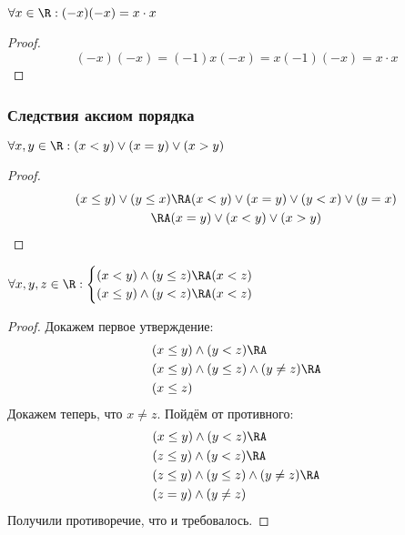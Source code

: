 \documentclass[a4paper, 14pt]{article}
\begin{document}
    \begin{theorem}
        $\forall x \in \R: (-x)(-x) = x \cdot x$
    \end{theorem}
    \begin{proof}
        \begin{equation*}
            (-x)(-x) = (-1)x(-x) = x(-1)(-x) = x \cdot x
        \end{equation*}
    \end{proof}

    \subsubsection*{Следствия аксиом порядка}

    \begin{theorem}
        $\forall x,y \in \R: (x < y) \lor (x = y) \lor (x > y)$
    \end{theorem}
    \begin{proof}
        \begin{multline*}
            (x \leq y) \lor (y \leq x) \RA (x < y) \lor (x = y) \lor (y < x) \lor (y = x) \\ \RA (x=y) \lor (x<y) \lor (x>y)
        \end{multline*}    
    \end{proof}

    \begin{theorem} $\forall x,y,z \in \R:
        \begin{cases}
            (x < y) \land (y \leq z) \RA (x < z) \\
            (x \leq y) \land (y < z) \RA (x < z)    
        \end{cases}$
    \end{theorem}
    \begin{proof}
        Докажем первое утверждение:
        \begin{align*}
            &(x \leq y) \land (y < z) \RA  \\
            &(x \leq y) \land (y \leq z) \land (y \neq z) \RA \\
            &(x \leq z)
        \end{align*}
        Докажем теперь, что $x \neq z$. Пойдём от противного:
        \begin{align*}
            &(x \leq y) \land (y < z) \RA \\
            &(z \leq y) \land (y < z) \RA \\
            &(z \leq y) \land (y \leq z) \land (y \neq z) \RA \\
            &(z = y) \land (y \neq z)
        \end{align*}Получили противоречие, что и требовалось.
    \end{proof}
\end{document}
